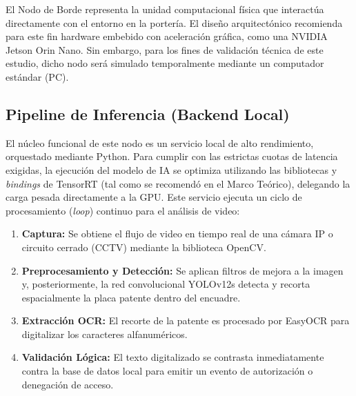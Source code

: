 El Nodo de Borde representa la unidad computacional física que interactúa directamente con el entorno en la portería. El diseño arquitectónico recomienda para este fin hardware embebido con aceleración gráfica, como una NVIDIA Jetson Orin Nano. Sin embargo, para los fines de validación técnica de este estudio, dicho nodo será simulado temporalmente mediante un computador estándar (PC).

\subsection{Pipeline de Inferencia (Backend Local)}
El núcleo funcional de este nodo es un servicio local de alto rendimiento, orquestado mediante Python. Para cumplir con las estrictas cuotas de latencia exigidas, la ejecución del modelo de IA se optimiza utilizando las bibliotecas y \textit{bindings} de TensorRT (tal como se recomendó en el Marco Teórico), delegando la carga pesada directamente a la GPU. Este servicio ejecuta un ciclo de procesamiento (\textit{loop}) continuo para el análisis de video:
\begin{enumerate}
    \item \textbf{Captura:} Se obtiene el flujo de video en tiempo real de una cámara IP o circuito cerrado (CCTV) mediante la biblioteca OpenCV.
    \item \textbf{Preprocesamiento y Detección:} Se aplican filtros de mejora a la imagen y, posteriormente, la red convolucional YOLOv12s detecta y recorta espacialmente la placa patente dentro del encuadre.
    \item \textbf{Extracción OCR:} El recorte de la patente es procesado por EasyOCR para digitalizar los caracteres alfanuméricos.
    \item \textbf{Validación Lógica:} El texto digitalizado se contrasta inmediatamente contra la base de datos local para emitir un evento de autorización o denegación de acceso.
\end{enumerate}

